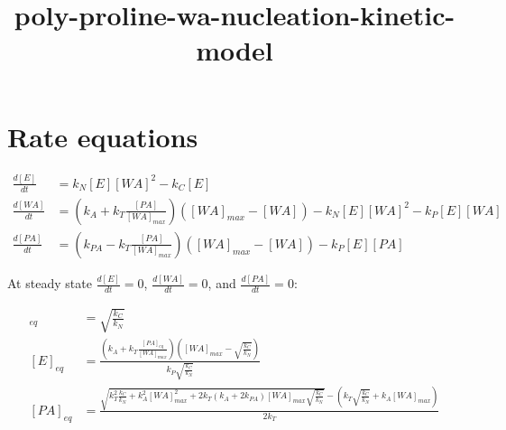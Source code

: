 \documentclass[11pt]{article}
\title{poly-proline-wa-nucleation-kinetic-model}
\begin{document}
    
    
    \maketitle
    
    

    
    \section{Rate equations}\label{rate-equations}

\begin{align}
\frac{d[E]}{dt} &= k_N [E] [WA]^2 - k_C [E] \\
\frac{d[WA]}{dt} &= (k_A + k_T \frac{[PA]}{[WA]_{max}}) ([WA]_{max} - [WA]) - k_N [E][WA]^2 - k_P [E][WA] \\
\frac{d[PA]}{dt} &= (k_{PA} - k_T \frac{[PA]}{[WA]_{max}})([WA]_{max} - [WA]) - k_P [E][PA]
\end{align}

At steady state \(\frac{d[E]}{dt} = 0\), \(\frac{d[WA]}{dt} = 0\), and
\(\frac{d[PA]}{dt} = 0\):

\begin{align}
[WA]_{eq} &= \sqrt{\frac{k_C}{k_N}} \\
[E]_{eq} &= \frac{(k_A + k_T \frac{[PA]_{eq}}{[WA]_{max}})([WA]_{max} - \sqrt{\frac{k_C}{k_N}})}{k_P \sqrt{\frac{k_C}{k_N}}} \\
[PA]_{eq} &= \frac{\sqrt{k_T^2 \frac{k_C}{k_N} + k_A^2 [WA]_{max}^2 + 2 k_T (k_A + 2 k_{PA})[WA]_{max} \sqrt{\frac{k_C}{k_N}}} - (k_T \sqrt{\frac{k_C}{k_N}} + k_A[WA]_{max})}{2 k_T}
\end{align}
\end{document}
